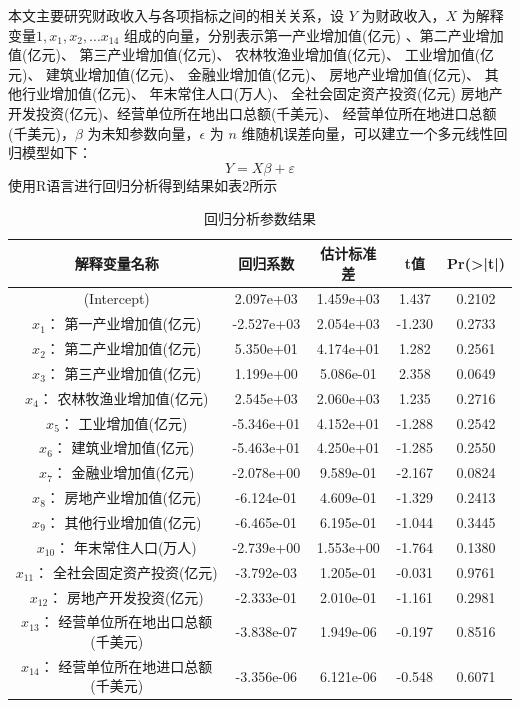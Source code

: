 \documentclass [a4paper]{article}
\begin{document}
本文主要研究财政收入与各项指标之间的相关关系，设 $Y$ 为财政收入，$X$ 为解释变量$1,x_1,x_2,...x_{14}$ 组成的向量，分别表示第一产业增加值(亿元)	、第二产业增加值(亿元)、	第三产业增加值(亿元)、	农林牧渔业增加值(亿元)、	工业增加值(亿元)、	建筑业增加值(亿元)、	金融业增加值(亿元)、	房地产业增加值(亿元)、	其他行业增加值(亿元)、	年末常住人口(万人)、	全社会固定资产投资(亿元)	房地产开发投资(亿元)、经营单位所在地出口总额(千美元)、	经营单位所在地进口总额(千美元)，$\beta$ 为未知参数向量，$\epsilon$ 为 $n$ 维随机误差向量，可以建立一个多元线性回归模型如下：
$$
Y=X\beta + \varepsilon
$$
使用R语言进行回归分析得到结果如表2所示
\begin{table}
  \centering
  \caption{回归分析参数结果}
  \small %
  \begin{tabular}{ccccc}
    \toprule
      解释变量名称 & 回归系数 & 估计标准差 & t值 & Pr(>|t|)  \\
    \midrule

    (Intercept)   & 2.097e+03 &   1.459e+03 &    1.437  &   0.2102 \\
    $x_1$： 第一产业增加值(亿元)      &      -2.527e+03  &  2.054e+03  &  -1.230  &   0.2733  \\
    $x_2$： 第二产业增加值(亿元)     &       5.350e+01  &  4.174e+01  &   1.282   &  0.2561  \\
    $x_3$： 第三产业增加值(亿元)      &      1.199e+00  &  5.086e-01  &   2.358   &  0.0649 \\
    $x_4$：  农林牧渔业增加值(亿元)       &     2.545e+03  &  2.060e+03  &   1.235  &   0.2716  \\
    $x_5$：  工业增加值(亿元)       &    -5.346e+01  &  4.152e+01  &  -1.288   &  0.2542  \\
    $x_6$： 建筑业增加值(亿元)      &     -5.463e+01  &  4.250e+01  &  -1.285   &  0.2550  \\
    $x_7$：   金融业增加值(亿元)     &     -2.078e+00  &  9.589e-01  &  -2.167  &   0.0824  \\
    $x_8$：   房地产业增加值(亿元)      &    -6.124e-01  &  4.609e-01  &  -1.329   &  0.2413  \\
    $x_9$：  其他行业增加值(亿元)      &    -6.465e-01  &  6.195e-01  &  -1.044   &  0.3445  \\
    $x_{10}$：   年末常住人口(万人)    &     -2.739e+00   & 1.553e+00  &  -1.764  &   0.1380  \\
    $x_{11}$：  全社会固定资产投资(亿元)     &     -3.792e-03  &  1.205e-01  &  -0.031   &  0.9761  \\
    $x_{12}$：  房地产开发投资(亿元)      &    -2.333e-01  &  2.010e-01  &  -1.161   &  0.2981  \\
    $x_{13}$：  经营单位所在地出口总额(千美元)   &    -3.838e-07  &  1.949e-06  &  -0.197   &  0.8516  \\
    $x_{14}$：  	经营单位所在地进口总额(千美元)        &     -3.356e-06   & 6.121e-06  &  -0.548   &  0.6071  \\
    \bottomrule

  \end{tabular}


\end{table}
\end{document}
